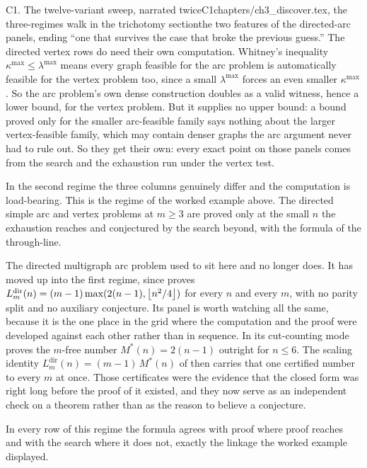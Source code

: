 \begin{offcutrewrite}{C1. The twelve-variant sweep, narrated twice}{C1}{chapters/ch3\_discover.tex, the three-regimes walk in the trichotomy section}{the two features of the directed-arc panels, ending ``one that survives the case that broke the previous guess.''}
The directed vertex rows do need their own computation. Whitney's inequality $\kappa^{\max} \le \lambda^{\max}$ means every graph feasible for the arc problem is automatically feasible for the vertex problem too, since a small $\lambda^{\max}$ forces an even smaller $\kappa^{\max}$. So the arc problem's own dense construction doubles as a valid witness, hence a lower bound, for the vertex problem. But it supplies no upper bound: a bound proved only for the smaller arc-feasible family says nothing about the larger vertex-feasible family, which may contain denser graphs the arc argument never had to rule out. So they get their own: every exact point on those panels comes from the search and the exhaustion run under the vertex test.

In the second regime the three columns genuinely differ and the computation is load-bearing. This is the regime of the worked example above. The directed simple arc and vertex problems at $m \ge 3$ are proved only at the small $n$ the exhaustion reaches and conjectured by the search beyond, with the formula of  the through-line.

The directed multigraph arc problem used to sit here and no longer does. It has moved up into the first regime, since  proves $L_m^{\mathrm{dir}}(n) = (m-1)\max(2(n-1), \left\lfloor n^2/4 \right\rfloor)$ for every $n$ and every $m$, with no parity split and no auxiliary conjecture. Its panel is worth watching all the same, because it is the one place in the grid where the computation and the proof were developed against each other rather than in sequence. In its cut-counting mode  proves the $m$-free number $M^{*}(n) = 2(n-1)$ outright for $n \le 6$. The scaling identity $L_m^{\mathrm{dir}}(n) = (m-1)\,M^{*}(n)$ of  then carries that one certified number to every $m$ at once. Those certificates were the evidence that the closed form was right long before the proof of it existed, and they now serve as an independent check on a theorem rather than as the reason to believe a conjecture.

In every row of this regime the formula agrees with proof where proof reaches and with the search where it does not, exactly the linkage the worked example displayed.


\end{offcutrewrite}
